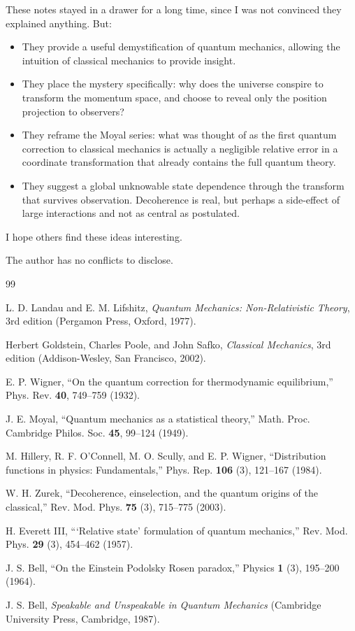 \documentclass[prb,preprint]{revtex4-1}
\begin{document}
These notes stayed in a drawer for a long time, since I was not convinced they explained anything.  But:
\begin{itemize}
\item They provide a useful demystification of quantum mechanics, allowing the intuition of classical mechanics to provide insight.
\item They place the mystery specifically: why does the universe conspire to transform the momentum space, and choose to reveal only the position projection to observers?
\item They reframe the Moyal series: what was thought of as the first quantum correction to classical mechanics is actually a negligible relative error in a coordinate transformation that already contains the full quantum theory.
\item They suggest a global unknowable state dependence through the transform that survives observation.  Decoherence is real, but perhaps a side-effect of large interactions and not as central as postulated.\cite{zurek2003}
\end{itemize}

I hope others find these ideas interesting.


\begin{acknowledgments}
The author has no conflicts to disclose.
\end{acknowledgments}


\begin{thebibliography}{99}

 L. D. Landau and E. M. Lifshitz, \textit{Quantum Mechanics:
Non-Relativistic Theory}, 3rd edition (Pergamon Press, Oxford, 1977).

 Herbert Goldstein, Charles Poole, and John Safko,
\textit{Classical Mechanics}, 3rd edition (Addison-Wesley, San Francisco, 2002).

 E. P. Wigner, ``On the quantum correction for thermodynamic
equilibrium,'' Phys. Rev. \textbf{40}, 749--759 (1932).

 J. E. Moyal, ``Quantum mechanics as a statistical theory,''
Math. Proc. Cambridge Philos. Soc. \textbf{45}, 99--124 (1949).

 M. Hillery, R. F. O'Connell, M. O. Scully, and E. P. Wigner,
``Distribution functions in physics: Fundamentals,''
Phys. Rep. \textbf{106} (3), 121--167 (1984).

 W. H. Zurek, ``Decoherence, einselection, and the quantum
origins of the classical,'' Rev. Mod. Phys. \textbf{75} (3), 715--775 (2003).

 H. Everett III, ```Relative state' formulation of quantum mechanics,''
Rev. Mod. Phys. \textbf{29} (3), 454--462 (1957).

 J. S. Bell, ``On the Einstein Podolsky Rosen paradox,''
Physics \textbf{1} (3), 195--200 (1964).

 J. S. Bell, \textit{Speakable and Unspeakable in Quantum Mechanics}
(Cambridge University Press, Cambridge, 1987).

\end{thebibliography}
\end{document}

